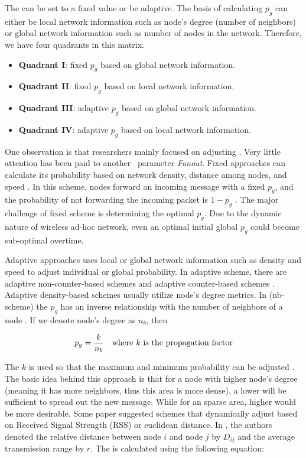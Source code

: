 The \emph{\pog} can be set to a fixed value or be adaptive. The basis of calculating $p_g$ can either be local network information such as node's degree (number of neighbors) or global network information such as number of nodes in the network. Therefore, we have four quadrants in this matrix. 

\begin{itemize}
	\item \textbf{Quadrant I}: fixed $p_g$ based on global network information. 
	\item \textbf{Quadrant II}: fixed $p_g$ based on local network information. 
	\item \textbf{Quadrant III}: adaptive $p_g$ based on global network information. 
	\item \textbf{Quadrant IV}: adaptive $p_g$ based on local network information. 
\end{itemize}

One observation is that researchers mainly focused on adjusting \emph{\pog}. Very little attention has been paid to another \gp ~parameter \emph{Fanout}. Fixed \emph{\pog} approaches can calculate its probability based on network density, distance among nodes, and speed \cite{2015survey}. In this scheme, nodes forward an incoming message with a fixed $p_g$, and the probability of not forwarding the incoming packet is $1-p_g$ \cite{2015survey}. The major challenge of fixed scheme is determining the optimal $p_g$. Due to the dynamic nature of wireless ad-hoc network, even an optimal initial global $p_g$ could become sub-optimal overtime. 

Adaptive \emph{\pog} approaches uses local or global network information such as density and speed to adjust individual or global probability. In adaptive scheme, there are adaptive non-counter-based schemes and adaptive counter-based schemes \cite{2015survey}. Adaptive density-based schemes usually utilize node's degree metrics. In (nb-scheme) the $p_g$ has an inverse relationship with the number of neighbors of a node \cite{cartigny2003border}. If we denote node's degree as $n_b$, then 

\[ p_g = \frac{k}{n_b} \mbox{\quad where $k$ is the propagation factor}\]

The $k$ is used so that the maximum and minimum probability can be adjusted \cite{cartigny2003border}. The basic idea behind this approach is that for a node with higher node's degree (meaning it has more neighbors, thus this area is more dense), a lower \emph{\pog} will be sufficient to spread out the new message. While for an sparse area, higher \emph{\pog} would be more desirable. Some paper \cite{qing2010dynamic} \cite{wisitpongphan2007broadcast} suggested schemes that dynamically adjust \emph{\pog} based on Received Signal Strength (RSS) or euclidean distance. In \cite{wisitpongphan2007broadcast}, the authors denoted the relative distance between node $i$ and node $j$ by $D_{ij}$ and the average transmission range by $r$. The \emph{\pog} is calculated using the following equation:


